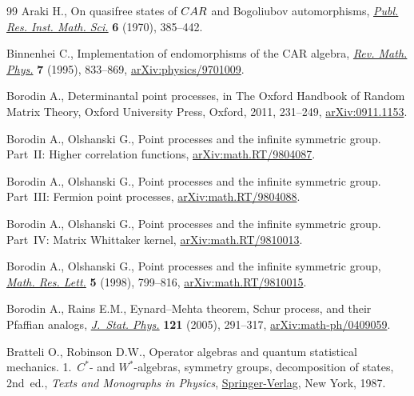 \documentclass[11pt]{article}
\numberwithin{equation}{section}
\numberwithin{equation}{section}
\begin{document}
\begin{thebibliography}{99}
Araki H., On quasifree states of {${\rm CAR}$} and {B}ogoliubov automorphisms,
 \href{https://doi.org/10.2977/prims/1195193913}{\textit{Publ. Res. Inst. Math. Sci.}} \textbf{6} (1970), 385--442.

Binnenhei C., Implementation of endomorphisms of the {CAR} algebra,
 \href{https://doi.org/10.1142/S0129055X95000323}{\textit{Rev. Math. Phys.}} \textbf{7} (1995), 833--869,
 \href{https://arxiv.org/abs/physics/9701009}{arXiv:physics/9701009}.

Borodin A., Determinantal point processes, in The {O}xford Handbook of Random
 Matrix Theory, Oxford University Press, Oxford, 2011, 231--249,
 \href{https://arxiv.org/abs/0911.1153}{arXiv:0911.1153}.

Borodin A., Olshanski G., Point processes and the infinite symmetric group.
 Part~II: Higher correlation functions, \href{https://arxiv.org/abs/math.RT/9804087}{arXiv:math.RT/9804087}.

Borodin A., Olshanski G., Point processes and the infinite symmetric group.
 Part~III: Fermion point processes, \href{https://arxiv.org/abs/math.RT/9804088}{arXiv:math.RT/9804088}.

Borodin A., Olshanski G., Point processes and the infinite symmetric group.
 Part~IV: Matrix Whittaker kernel, \href{https://arxiv.org/abs/math.RT/9810013}{arXiv:math.RT/9810013}.

Borodin A., Olshanski G., Point processes and the infinite symmetric group,
 \href{https://doi.org/10.4310/MRL.1998.v5.n6.a9}{\textit{Math. Res. Lett.}} \textbf{5} (1998), 799--816,
 \href{https://arxiv.org/abs/math.RT/9810015}{arXiv:math.RT/9810015}.

Borodin A., Rains E.M., Eynard--{M}ehta theorem, {S}chur process, and their
 {P}faffian analogs, \href{https://doi.org/10.1007/s10955-005-7583-z}{\textit{J.~Stat. Phys.}} \textbf{121} (2005), 291--317,
 \href{https://arxiv.org/abs/math-ph/0409059}{arXiv:math-ph/0409059}.

Bratteli O., Robinson D.W., Operator algebras and quantum statistical
 mechanics. 1.~$C^\ast$- and $W^\ast$-algebras, symmetry groups, decomposition
 of states, 2nd~ed., \textit{Texts and Monographs in Physics}, \href{https://doi.org/10.1007/978-3-662-02520-8}{Springer-Verlag}, New
 York, 1987.


\end{thebibliography}
\end{document}
